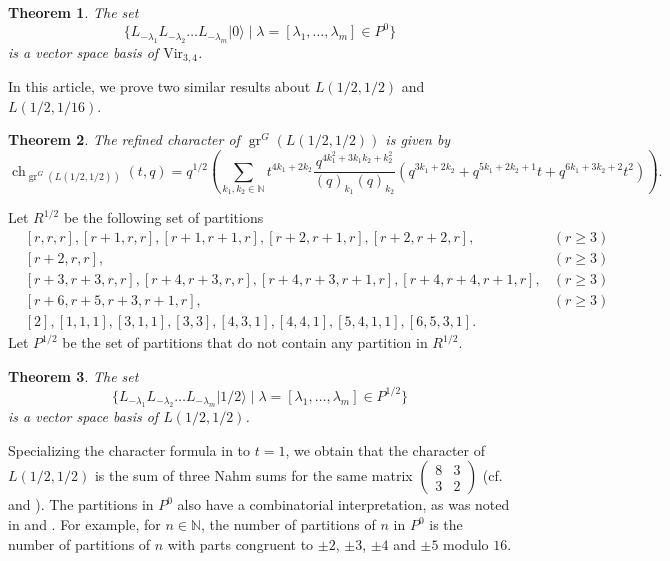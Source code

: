 \documentclass[a4paper, 12pt, reqno]{amsart}
\newtheorem{theorem}{Theorem}[section]
\theoremstyle{remark}
\DeclareMathOperator{\gr}{gr}
\DeclareMathOperator{\ch}{ch}
\newcommand{\vac}{{|0\rangle}}
\newcommand{\vachalf}{{|1/2\rangle}}
\newcommand{\Vir}{{\mathrm{Vir}}}
\begin{document}
\begin{theorem}
  \label{thr:2}
  The set
  \begin{equation*}
    \{L_{-\lambda_1}L_{-\lambda_2}\dots L_{-\lambda_m}\vac \mid \lambda = [\lambda_1, \dots, \lambda_m] \in P^0\}
  \end{equation*}
  is a vector space basis of $\Vir_{3, 4}$.
\end{theorem}

In this article, we prove two similar results about $L(1/2, 1/2)$ and $L(1/2, 1/16)$.

\begin{theorem}
  \label{thr:3}
  The refined character of $\gr^G(L(1/2, 1/2))$ is given by
  \begin{equation*}
    \ch_{\gr^G(L(1/2, 1/2))}(t, q) = q^{1/2}\left(\sum_{k_1, k_2 \in \mathbb{N}}t^{4k_1 + 2k_2}\frac{q^{4k_1^2 + 3k_1k_2 + k_2^2}}{(q)_{k_1}(q)_{k_2}}(q^{3k_1 + 2k_2} + q^{5k_1 + 2k_2 + 1}t + q^{6k_1 + 3k_2 + 2}t^2)\right).
  \end{equation*}
\end{theorem}

Let $R^{1/2}$ be the following set of partitions
\begin{align*}
  &[r, r, r], [r + 1, r, r], [r + 1, r + 1, r], [r + 2, r + 1, r], [r + 2, r + 2, r], &(r \ge 3) \\
  &[r + 2, r, r], &(r \ge 3) \\
  &[r + 3, r + 3, r, r], [r + 4, r + 3, r, r],  [r + 4, r + 3, r + 1, r], [r + 4, r + 4, r + 1, r], &(r \ge 3)\\
  &[r + 6, r + 5, r + 3, r + 1, r], &(r \ge 3) \\
  &[2], [1, 1, 1], [3, 1, 1], [3, 3], [4, 3, 1], [4, 4, 1], [5, 4, 1, 1], [6, 5, 3, 1].
\end{align*}
Let $P^{1/2}$ be the set of partitions that do not contain any partition in $R^{1/2}$.

\begin{theorem}
  \label{thr:4}
  The set
  \begin{equation*}
    \{L_{-\lambda_1}L_{-\lambda_2}\dots L_{-\lambda_m}\vachalf \mid \lambda = [\lambda_1, \dots, \lambda_m] \in P^{1/2}\}
  \end{equation*}
  is a vector space basis of $L(1/2, 1/2)$.
\end{theorem}

Specializing the character formula in  to $t = 1$, we obtain that the character of $L(1/2, 1/2)$ is the sum of three Nahm sums for the same matrix $\left(\begin{smallmatrix} 8 & 3 \\ 3 & 2 \end{smallmatrix}\right)$ (cf.\ \cite{Nahm2007} and \cite{andrews_singular_2022}).
The partitions in $P^0$ also have a combinatorial interpretation, as was noted in \cite{andrews_singular_2022} and \cite{tsuchioka_vertex_2023}.
For example, for $n \in \mathbb{N}$, the number of partitions of $n$ in $P^0$ is the number of partitions of $n$ with parts congruent to $\pm2$, $\pm3$, $\pm4$ and $\pm5$ modulo $16$.
\end{document}
